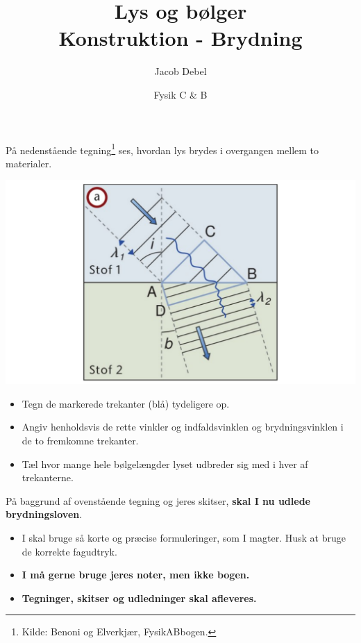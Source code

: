 \documentclass[a4paper, 12pt]{article}
\author{Jacob Debel}
\date{Fysik C \& B}
\title{Lys og bølger\\\medskip
\large Konstruktion - Brydning}
\begin{document}
\maketitle
På nedenstående tegning\footnote{Kilde: Benoni og Elverkjær, FysikABbogen.} ses, hvordan lys brydes i overgangen mellem to materialer.

\begin{center}
\includegraphics[width=.9\linewidth]{./img/brydning.png}
\end{center}

\begin{itemize}
\item Tegn de markerede trekanter (blå) tydeligere op.

\item Angiv henholdsvis de rette vinkler og indfaldsvinklen og brydningsvinklen i de to fremkomne trekanter.

\item Tæl hvor mange hele bølgelængder lyset udbreder sig med i hver af trekanterne.
\end{itemize}

På baggrund af ovenstående tegning og jeres skitser, \textbf{skal I nu udlede brydningsloven}.


\begin{itemize}
\item I skal bruge så korte og præcise formuleringer, som I magter. Husk at bruge de korrekte fagudtryk.
\item \textbf{I må gerne bruge jeres noter, men ikke bogen.}
\item \textbf{Tegninger, skitser og udledninger skal afleveres.}
\end{itemize}
\end{document}
